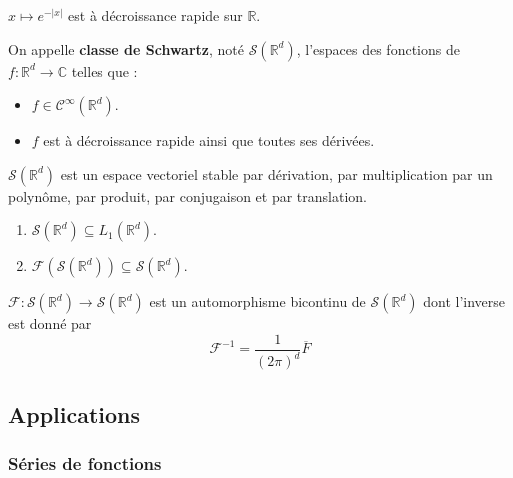 	\begin{example}
		$x \mapsto e^{-\vert x \vert}$ est à décroissance rapide sur $\mathbb{R}$.
	\end{example}

	\begin{definition}
		On appelle \textbf{classe de Schwartz}, noté $\mathcal{S}(\mathbb{R}^d)$, l'espaces des fonctions de $f : \mathbb{R}^d \rightarrow \mathbb{C}$ telles que :
		\begin{itemize}
			\item $f \in \mathcal{C}^\infty(\mathbb{R}^d)$.
			\item $f$ est à décroissance rapide ainsi que toutes ses dérivées.
		\end{itemize}
	\end{definition}

	\begin{proposition}
		$\mathcal{S}(\mathbb{R}^d)$ est un espace vectoriel stable par dérivation, par multiplication par un polynôme, par produit, par conjugaison et par translation.
	\end{proposition}

	\begin{theorem}
		\begin{enumerate}[label=(\roman*)]
			\item $\mathcal{S}(\mathbb{R}^d) \subseteq L_1(\mathbb{R}^d)$.
			\item $\mathcal{F}(\mathcal{S}(\mathbb{R}^d)) \subseteq \mathcal{S}(\mathbb{R}^d)$.
		\end{enumerate}
	\end{theorem}

	\begin{theorem}
		$\mathcal{F} : \mathcal{S}(\mathbb{R}^d) \rightarrow \mathcal{S}(\mathbb{R}^d)$ est un automorphisme bicontinu de $\mathcal{S}(\mathbb{R}^d)$ dont l'inverse est donné par
		\[ \mathcal{F}^{-1} = \frac{1}{(2 \pi)^d} \overline{F} \]
	\end{theorem}

	\subsection{Applications}

	\subsubsection{Séries de fonctions}


